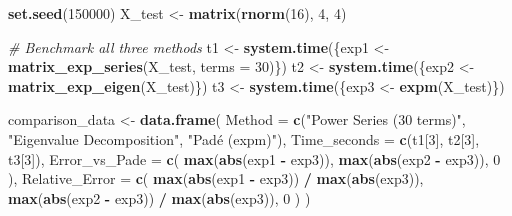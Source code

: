 \documentclass[
]{book}
\newenvironment{Shaded}{\begin{snugshade}}{\end{snugshade}}
\newcommand{\AttributeTok}[1]{\textcolor[rgb]{0.13,0.29,0.53}{#1}}
\newcommand{\CommentTok}[1]{\textcolor[rgb]{0.56,0.35,0.01}{\textit{#1}}}
\newcommand{\DecValTok}[1]{\textcolor[rgb]{0.00,0.00,0.81}{#1}}
\newcommand{\FunctionTok}[1]{\textcolor[rgb]{0.13,0.29,0.53}{\textbf{#1}}}
\newcommand{\NormalTok}[1]{#1}
\newcommand{\OtherTok}[1]{\textcolor[rgb]{0.56,0.35,0.01}{#1}}
\newcommand{\SpecialCharTok}[1]{\textcolor[rgb]{0.81,0.36,0.00}{\textbf{#1}}}
\newcommand{\StringTok}[1]{\textcolor[rgb]{0.31,0.60,0.02}{#1}}
\theoremstyle{definition}
\theoremstyle{definition}
\theoremstyle{definition}
\theoremstyle{definition}
\theoremstyle{remark}
\begin{document}
\begin{Shaded}
\begin{Highlighting}[]
\FunctionTok{set.seed}\NormalTok{(}\DecValTok{150000}\NormalTok{)}
\NormalTok{X\_test }\OtherTok{\textless{}{-}} \FunctionTok{matrix}\NormalTok{(}\FunctionTok{rnorm}\NormalTok{(}\DecValTok{16}\NormalTok{), }\DecValTok{4}\NormalTok{, }\DecValTok{4}\NormalTok{)}

\CommentTok{\# Benchmark all three methods}
\NormalTok{t1 }\OtherTok{\textless{}{-}} \FunctionTok{system.time}\NormalTok{(\{exp1 }\OtherTok{\textless{}{-}} \FunctionTok{matrix\_exp\_series}\NormalTok{(X\_test, }\AttributeTok{terms =} \DecValTok{30}\NormalTok{)\})}
\NormalTok{t2 }\OtherTok{\textless{}{-}} \FunctionTok{system.time}\NormalTok{(\{exp2 }\OtherTok{\textless{}{-}} \FunctionTok{matrix\_exp\_eigen}\NormalTok{(X\_test)\})}
\NormalTok{t3 }\OtherTok{\textless{}{-}} \FunctionTok{system.time}\NormalTok{(\{exp3 }\OtherTok{\textless{}{-}} \FunctionTok{expm}\NormalTok{(X\_test)\})}

\NormalTok{comparison\_data }\OtherTok{\textless{}{-}} \FunctionTok{data.frame}\NormalTok{(}
  \AttributeTok{Method =} \FunctionTok{c}\NormalTok{(}\StringTok{"Power Series (30 terms)"}\NormalTok{, }\StringTok{"Eigenvalue Decomposition"}\NormalTok{, }\StringTok{"Padé (expm)"}\NormalTok{),}
  \AttributeTok{Time\_seconds =} \FunctionTok{c}\NormalTok{(t1[}\DecValTok{3}\NormalTok{], t2[}\DecValTok{3}\NormalTok{], t3[}\DecValTok{3}\NormalTok{]),}
  \AttributeTok{Error\_vs\_Pade =} \FunctionTok{c}\NormalTok{(}
    \FunctionTok{max}\NormalTok{(}\FunctionTok{abs}\NormalTok{(exp1 }\SpecialCharTok{{-}}\NormalTok{ exp3)),}
    \FunctionTok{max}\NormalTok{(}\FunctionTok{abs}\NormalTok{(exp2 }\SpecialCharTok{{-}}\NormalTok{ exp3)),}
    \DecValTok{0}
\NormalTok{  ),}
  \AttributeTok{Relative\_Error =} \FunctionTok{c}\NormalTok{(}
    \FunctionTok{max}\NormalTok{(}\FunctionTok{abs}\NormalTok{(exp1 }\SpecialCharTok{{-}}\NormalTok{ exp3)) }\SpecialCharTok{/} \FunctionTok{max}\NormalTok{(}\FunctionTok{abs}\NormalTok{(exp3)),}
    \FunctionTok{max}\NormalTok{(}\FunctionTok{abs}\NormalTok{(exp2 }\SpecialCharTok{{-}}\NormalTok{ exp3)) }\SpecialCharTok{/} \FunctionTok{max}\NormalTok{(}\FunctionTok{abs}\NormalTok{(exp3)),}
    \DecValTok{0}
\NormalTok{  )}
\NormalTok{)}


\end{Highlighting}
\end{Shaded}
\end{document}
